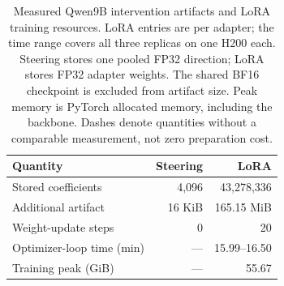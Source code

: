 \begin{table}[t]
\centering
\small
\begin{tabular}{lrr}
\toprule
Quantity & Steering & LoRA \\
\midrule
Stored coefficients & 4,096 & 43,278,336 \\
Additional artifact & 16 KiB & 165.15 MiB \\
Weight-update steps & 0 & 20 \\
Optimizer-loop time (min) & --- & 15.99--16.50 \\
Training peak (GiB) & --- & 55.67 \\
\bottomrule
\end{tabular}
\caption{Measured Qwen9B intervention artifacts and LoRA training resources.
LoRA entries are per adapter; the time range covers all three replicas on one H200 each.
Steering stores one pooled FP32 direction; LoRA stores FP32 adapter weights.
The shared BF16 checkpoint is excluded from artifact size. Peak memory is
PyTorch allocated memory, including the backbone. Dashes denote quantities
without a comparable measurement, not zero preparation cost.}
\label{tab:current-resource-cost}
\end{table}
